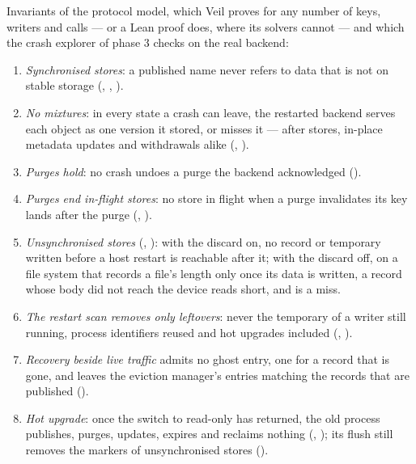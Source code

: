 Invariants of the protocol model, which Veil proves for any number of keys,
writers and calls --- or a Lean proof does, where its solvers cannot --- and
which the crash explorer of phase 3 checks on the real backend:
\begin{enumerate}
  \item \emph{Synchronised stores}: a published name never refers to data
    that is not on stable storage (,
    , ).
  \item \emph{No mixtures}: in every state a crash can leave, the restarted
    backend serves each object as one version it stored, or misses it ---
    after stores, in-place metadata updates and withdrawals alike
    (,
    ).
  \item \emph{Purges hold}: no crash undoes a purge the backend acknowledged
    ().
  \item \emph{Purges end in-flight stores}: no store in flight when a purge
    invalidates its key lands after the purge
    (, ).
  \item \emph{Unsynchronised stores} (,
    ): with the discard on, no record
    or temporary written before a host restart is reachable after it; with
    the discard off, on a file system that records a file's length only once
    its data is written, a record whose body did not reach the device reads
    short, and is a miss.
  \item \emph{The restart scan removes only leftovers}: never the temporary
    of a writer still running, process identifiers reused and hot upgrades
    included (,
    ).
  \item \emph{Recovery beside live traffic} admits no ghost entry, one for a
    record that is gone, and leaves the eviction manager's entries matching
    the records that are published ().
  \item \emph{Hot upgrade}: once the switch to read-only has returned, the
    old process publishes, purges, updates, expires and reclaims nothing
    (, ); its
    flush still removes the markers of unsynchronised stores
    ().
\end{enumerate}

